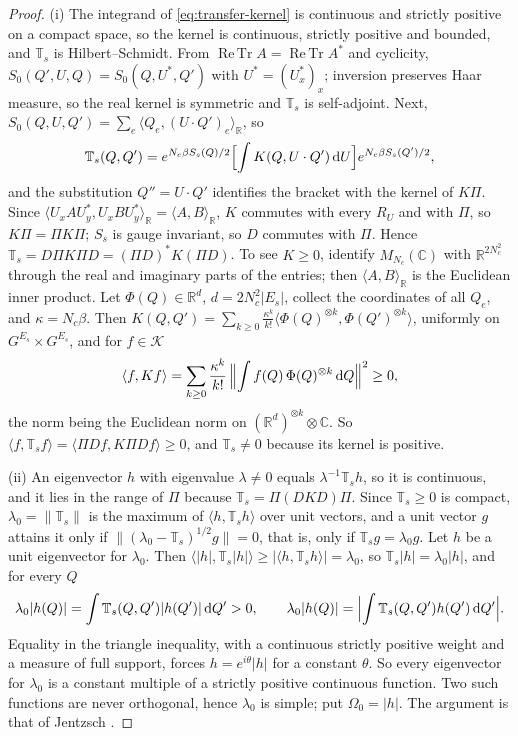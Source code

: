 \documentclass[11pt,a4paper]{amsart}
\theoremstyle{definition}
\theoremstyle{remark}
\numberwithin{equation}{section}
\DeclareMathOperator{\ReTr}{Re\,Tr}  %
\newcommand{\R}{\mathbb{R}}          %
\newcommand{\C}{\mathbb{C}}          %
\newcommand{\Kspace}{\mathcal{K}}    %
\newcommand{\ip}[2]{\langle #1,#2\rangle}  %
\newcommand{\norm}[1]{\lVert #1\rVert}     %
\newcommand{\abs}[1]{\lvert #1\rvert}      %
\newcommand{\dd}{\,\mathrm{d}}             %
\newcommand{\TT}{\mathbb{T}}               %
\newcommand{\lzero}{\lambda_0}             %
\newcommand{\Omegazero}{\Omega_0}          %
\begin{document}
\begin{proof}
(i) The integrand of \eqref{eq:transfer-kernel} is continuous and strictly positive on a compact space, so the kernel is continuous, strictly positive and bounded, and $\TT_s$ is Hilbert--Schmidt. From $\ReTr A=\ReTr A^*$ and cyclicity, $S_0(Q',U,Q)=S_0(Q,U^*,Q')$ with $U^*=(U_x^*)_x$; inversion preserves Haar measure, so the real kernel is symmetric and $\TT_s$ is self-adjoint. Next, $S_0(Q,U,Q')=\sum_e\ip{Q_e}{(U\cdot Q')_e}_{\R}$, so
\[
\TT_s(Q,Q')=e^{N_c\beta S_s(Q)/2}\Bigl[\int K(Q,U\cdot Q')\dd U\Bigr]e^{N_c\beta S_s(Q')/2},
\]
and the substitution $Q''=U\cdot Q'$ identifies the bracket with the kernel of $K\Pi$. Since $\ip{U_xAU_y^*}{U_xBU_y^*}_{\R}=\ip{A}{B}_{\R}$, $K$ commutes with every $R_U$ and with $\Pi$, so $K\Pi=\Pi K\Pi$; $S_s$ is gauge invariant, so $D$ commutes with $\Pi$. Hence $\TT_s=D\Pi K\Pi D=(\Pi D)^*K(\Pi D)$. To see $K\ge0$, identify $M_{N_c}(\C)$ with $\R^{2N_c^2}$ through the real and imaginary parts of the entries; then $\ip{A}{B}_{\R}$ is the Euclidean inner product. Let $\Phi(Q)\in\R^d$, $d=2N_c^2|E_s|$, collect the coordinates of all $Q_e$, and $\kappa=N_c\beta$. Then $K(Q,Q')=\sum_{k\ge0}\frac{\kappa^k}{k!}\ip{\Phi(Q)^{\otimes k}}{\Phi(Q')^{\otimes k}}$, uniformly on $G^{E_s}\times G^{E_s}$, and for $f\in\Kspace$
\[
\ip{f}{Kf}=\sum_{k\ge0}\frac{\kappa^k}{k!}\,\Bigl\lVert\int f(Q)\,\Phi(Q)^{\otimes k}\dd Q\Bigr\rVert^2\ge0,
\]
the norm being the Euclidean norm on $(\R^d)^{\otimes k}\otimes\C$. So $\ip{f}{\TT_sf}=\ip{\Pi Df}{K\Pi Df}\ge0$, and $\TT_s\ne0$ because its kernel is positive.

(ii) An eigenvector $h$ with eigenvalue $\lambda\ne0$ equals $\lambda^{-1}\TT_sh$, so it is continuous, and it lies in the range of $\Pi$ because $\TT_s=\Pi(DKD)\Pi$. Since $\TT_s\ge0$ is compact, $\lzero=\norm{\TT_s}$ is the maximum of $\ip{h}{\TT_sh}$ over unit vectors, and a unit vector $g$ attains it only if $\norm{(\lzero-\TT_s)^{1/2}g}=0$, that is, only if $\TT_sg=\lzero g$. Let $h$ be a unit eigenvector for $\lzero$. Then $\ip{\abs{h}}{\TT_s\abs{h}}\ge\abs{\ip{h}{\TT_sh}}=\lzero$, so $\TT_s\abs{h}=\lzero\abs{h}$, and for every $Q$
\[
\lzero\abs{h(Q)}=\int\TT_s(Q,Q')\abs{h(Q')}\dd Q'>0,\qquad \lzero\abs{h(Q)}=\Bigl\lvert\int\TT_s(Q,Q')h(Q')\dd Q'\Bigr\rvert .
\]
Equality in the triangle inequality, with a continuous strictly positive weight and a measure of full support, forces $h=e^{i\theta}\abs{h}$ for a constant $\theta$. So every eigenvector for $\lzero$ is a constant multiple of a strictly positive continuous function. Two such functions are never orthogonal, hence $\lzero$ is simple; put $\Omegazero=\abs{h}$. The argument is that of Jentzsch \cite{jentzsch1912}.


\end{proof}
\end{document}
